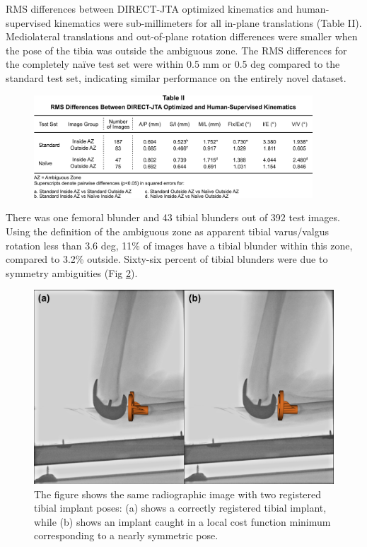 RMS differences between DIRECT-JTA optimized kinematics and human-supervised kinematics were sub-millimeters for all in-plane translations (Table II). Mediolateral translations and out-of-plane rotation differences were smaller when the pose of the tibia was outside the ambiguous zone. The RMS differences for the completely naïve test set were within 0.5 mm or 0.5 deg compared to the standard test set, indicating similar performance on the entirely novel dataset.

\begin{figure}[hb]
    \centering
    \includegraphics[width = 0.93\textwidth]{figs/jtml-paper/tab2-directjta-rms-diff.png}
    \label{tab:direct-rms}
\end{figure}

There was one femoral blunder and 43 tibial blunders out of 392 test images. Using the definition of the ambiguous zone as apparent tibial varus/valgus rotation less than 3.6 deg, 11\% of images have a tibial blunder within this zone, compared to 3.2\% outside. Sixty-six percent of tibial blunders were due to symmetry ambiguities (Fig \ref{fig:sym-trap}). 


\begin{figure}[!h]
    \centering
    \includegraphics[width = \linewidth]{figs/jtml-paper/fig6-symtrap.png}
    \caption{The figure shows the same radiographic image with two registered tibial implant poses: (a) shows a correctly registered tibial implant, while (b) shows an implant caught in a local cost function minimum corresponding to a nearly symmetric pose.}
    \label{fig:sym-trap}
\end{figure}

